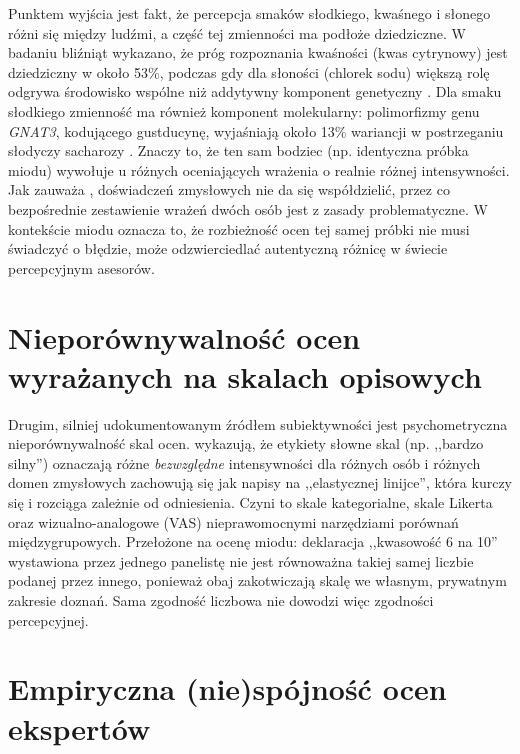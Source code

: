 \documentclass[12pt,a4paper]{article}
\begin{document}
Punktem wyjścia jest fakt, że percepcja smaków słodkiego, kwaśnego i słonego różni się między
ludźmi, a część tej zmienności ma podłoże dziedziczne. W badaniu bliźniąt wykazano, że próg
rozpoznania kwaśności (kwas cytrynowy) jest dziedziczny w około 53\%, podczas gdy dla słoności
(chlorek sodu) większą rolę odgrywa środowisko wspólne niż addytywny komponent genetyczny
\cite{wise2007twin}. Dla smaku słodkiego zmienność ma również komponent molekularny:
polimorfizmy genu \textit{GNAT3}, kodującego gustducynę, wyjaśniają około 13\% wariancji
w postrzeganiu słodyczy sacharozy \cite{fushan2010sweet}. Znaczy to, że ten sam bodziec 
(np. identyczna próbka miodu) wywołuje u różnych oceniających wrażenia o realnie różnej
intensywności. Jak zauważa \cite{bartoshuk2000comparing}, doświadczeń zmysłowych nie da się
współdzielić, przez co bezpośrednie zestawienie wrażeń dwóch osób jest z zasady problematyczne.
W kontekście miodu oznacza to, że rozbieżność ocen tej samej próbki nie musi świadczyć o błędzie, może odzwierciedlać autentyczną różnicę w świecie percepcyjnym asesorów.
 
\section{Nieporównywalność ocen wyrażanych na skalach opisowych}
 
Drugim, silniej udokumentowanym źródłem subiektywności jest psychometryczna nieporównywalność
skal ocen. \cite{bartoshuk2003labeled} wykazują, że etykiety słowne skal (np. ,,bardzo silny'')
oznaczają różne \emph{bezwzględne} intensywności dla różnych osób i różnych domen zmysłowych
zachowują się jak napisy na ,,elastycznej linijce'', która kurczy się i rozciąga zależnie od
odniesienia. Czyni to skale kategorialne, skale Likerta oraz wizualno-analogowe (VAS)
nieprawomocnymi narzędziami porównań międzygrupowych. Przełożone na ocenę miodu: deklaracja
,,kwasowość 6 na 10'' wystawiona przez jednego panelistę nie jest równoważna takiej samej liczbie
podanej przez innego, ponieważ obaj zakotwiczają skalę we własnym, prywatnym zakresie doznań.
Sama zgodność liczbowa nie dowodzi więc zgodności percepcyjnej.
 
\section{Empiryczna (nie)spójność ocen ekspertów}
 
\end{document}
